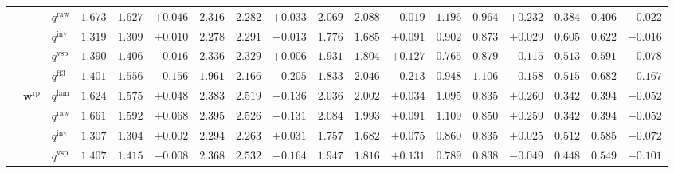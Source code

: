 \documentclass{article}
\begin{document}
\begin{table}[!htbp]
{\begin{tabular}{lll ccc ccc ccc ccc ccc}
 &  & $q^{\mathrm{raw}}$ & $1.673$ & $1.627$ & \cellcolor{posgreen!50}$+0.046$ & $2.316$ & $2.282$ & \cellcolor{posgreen!50}$+0.033$ & $2.069$ & $2.088$ & \cellcolor{negred!50}$-0.019$ & $1.196$ & $0.964$ & \cellcolor{posgreen!50}$+0.232$ & $0.384$ & $0.406$ & \cellcolor{negred!50}$-0.022$ \\
 &  & $q^{\mathrm{inv}}$ & $1.319$ & $1.309$ & \cellcolor{posgreen!50}$+0.010$ & $2.278$ & $2.291$ & \cellcolor{negred!50}$-0.013$ & $1.776$ & $1.685$ & \cellcolor{posgreen!50}$+0.091$ & $0.902$ & $0.873$ & \cellcolor{posgreen!50}$+0.029$ & $0.605$ & $0.622$ & \cellcolor{negred!50}$-0.016$ \\
 &  & $q^{\mathrm{vsp}}$ & $1.390$ & $1.406$ & \cellcolor{negred!50}$-0.016$ & $2.336$ & $2.329$ & \cellcolor{posgreen!50}$+0.006$ & $1.931$ & $1.804$ & \cellcolor{posgreen!50}$+0.127$ & $0.765$ & $0.879$ & \cellcolor{negred!50}$-0.115$ & $0.513$ & $0.591$ & \cellcolor{negred!50}$-0.078$ \\
 &  & $q^{\mathrm{ff3}}$ & $1.401$ & $1.556$ & \cellcolor{negred!50}$-0.156$ & $1.961$ & $2.166$ & \cellcolor{negred!50}$-0.205$ & $1.833$ & $2.046$ & \cellcolor{negred!50}$-0.213$ & $0.948$ & $1.106$ & \cellcolor{negred!50}$-0.158$ & $0.515$ & $0.682$ & \cellcolor{negred!50}$-0.167$ \\
\cmidrule(lr){2-18}
 & $\mathbf{w}^{\mathrm{rp}}$ & $q^{\mathrm{lam}}$ & $1.624$ & $1.575$ & \cellcolor{posgreen!50}$+0.048$ & $2.383$ & $2.519$ & \cellcolor{negred!50}$-0.136$ & $2.036$ & $2.002$ & \cellcolor{posgreen!50}$+0.034$ & $1.095$ & $0.835$ & \cellcolor{posgreen!50}$+0.260$ & $0.342$ & $0.394$ & \cellcolor{negred!50}$-0.052$ \\
 &  & $q^{\mathrm{raw}}$ & $1.661$ & $1.592$ & \cellcolor{posgreen!50}$+0.068$ & $2.395$ & $2.526$ & \cellcolor{negred!50}$-0.131$ & $2.084$ & $1.993$ & \cellcolor{posgreen!50}$+0.091$ & $1.109$ & $0.850$ & \cellcolor{posgreen!50}$+0.259$ & $0.342$ & $0.394$ & \cellcolor{negred!50}$-0.052$ \\
 &  & $q^{\mathrm{inv}}$ & $1.307$ & $1.304$ & \cellcolor{posgreen!50}$+0.002$ & $2.294$ & $2.263$ & \cellcolor{posgreen!50}$+0.031$ & $1.757$ & $1.682$ & \cellcolor{posgreen!50}$+0.075$ & $0.860$ & $0.835$ & \cellcolor{posgreen!50}$+0.025$ & $0.512$ & $0.585$ & \cellcolor{negred!50}$-0.072$ \\
 &  & $q^{\mathrm{vsp}}$ & $1.407$ & $1.415$ & \cellcolor{negred!50}$-0.008$ & $2.368$ & $2.532$ & \cellcolor{negred!50}$-0.164$ & $1.947$ & $1.816$ & \cellcolor{posgreen!50}$+0.131$ & $0.789$ & $0.838$ & \cellcolor{negred!50}$-0.049$ & $0.448$ & $0.549$ & \cellcolor{negred!50}$-0.101$ \\

\end{tabular}}
\end{table}
\end{document}
